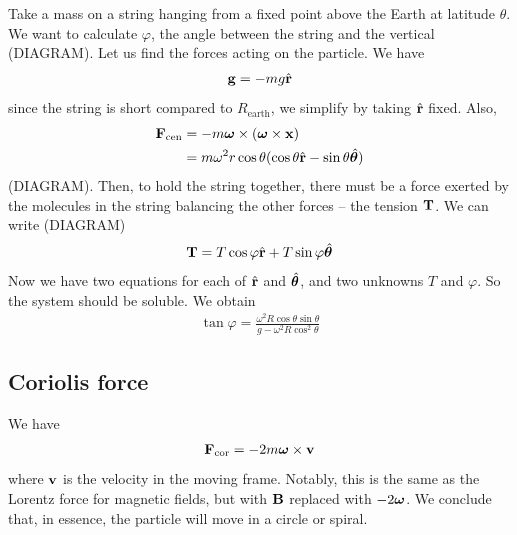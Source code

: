 \documentclass{../template/note}
\begin{document}
    \begin{example*}
        Take a mass on a string hanging from a fixed point above the Earth at latitude \(\theta\). We want to calculate \(\varphi\), the angle between the string and the vertical (DIAGRAM). Let us find the forces acting on the particle. We have
        \begin{align*}
            \V g = -mg \hvec r
        \end{align*}
        since the string is short compared to \(R_\text{earth}\), we simplify by taking \(\hvec r\) fixed. Also,
        \begin{align*}
            \V F_\text{cen} &= -m \V \omega \times (\V \omega \times \V x) \\
            &= m\omega^2 r \cos \theta (\cos \theta \hvec r - \sin \theta \hvec \theta)
        \end{align*}
        (DIAGRAM). Then, to hold the string together, there must be a force exerted by the molecules in the string balancing the other forces --  the tension \(\V T\). We can write (DIAGRAM)
        \begin{align*}
            \V T = T \cos \varphi \hvec r + T \sin \varphi \hvec \theta
        \end{align*}
        Now we have two equations for each of \(\hvec r\) and \(\hvec \theta\), and two unknowns \(T\) and \(\varphi\). So the system should be soluble. We obtain
        \begin{align*}
            \tan \varphi = \frac{\omega^2 R \cos \theta \sin \theta}{g - \omega^2 R \cos^2\theta}
        \end{align*}       
    \end{example*}
    
    \subsection{Coriolis force}

    We have
    \begin{align*}
        \V F_\text{cor} = -2m \V \omega \times \V v
    \end{align*}
    where \(\V v\) is the velocity in the moving frame. Notably, this is the same as the Lorentz force for magnetic fields, but with \(\V B\) replaced with \(-2 \V \omega\). We conclude that, in essence, the particle will move in a circle or spiral.
    
\end{document}
